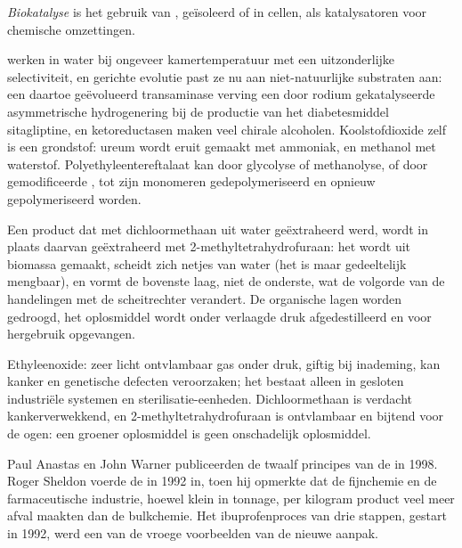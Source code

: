 \begin{definition}[Biokatalyse]\label{def:b3:green-industrial:biocatalysis}
\emph{Biokatalyse} is het gebruik van ,
geïsoleerd of in cellen, als katalysatoren voor chemische omzettingen.
\end{definition}

 werken in water bij ongeveer kamertemperatuur met een
uitzonderlijke selectiviteit, en gerichte evolutie past ze nu aan
niet-natuurlijke substraten aan: een daartoe geëvolueerd transaminase
verving een door rodium gekatalyseerde asymmetrische hydrogenering bij de
productie van het diabetesmiddel sitagliptine, en ketoreductasen maken
veel chirale alcoholen. Koolstofdioxide zelf is een grondstof: ureum
wordt eruit gemaakt met ammoniak, en methanol met waterstof.
Polyethyleentereftalaat kan door glycolyse of methanolyse, of door
gemodificeerde , tot zijn monomeren gedepolymeriseerd en opnieuw
gepolymeriseerd worden.

\begin{inthelab}
Een product dat met dichloormethaan uit water geëxtraheerd werd, wordt in
plaats daarvan geëxtraheerd met 2-methyltetrahydrofuraan: het wordt uit
biomassa gemaakt, scheidt zich netjes van water (het is maar gedeeltelijk
mengbaar), en vormt de bovenste laag, niet de onderste, wat de volgorde
van de handelingen met de scheitrechter verandert. De organische lagen
worden gedroogd, het oplosmiddel wordt onder verlaagde druk afgedestilleerd
en voor hergebruik opgevangen.
\end{inthelab}

\begin{safety}{}
Ethyleenoxide: zeer licht ontvlambaar gas onder druk, giftig bij
inademing, kan kanker en genetische defecten veroorzaken; het bestaat
alleen in gesloten industriële systemen en sterilisatie-eenheden.
Dichloormethaan is verdacht kankerverwekkend, en 2-methyltetrahydrofuraan
is ontvlambaar en bijtend voor de ogen: een groener oplosmiddel is geen
onschadelijk oplosmiddel.
\end{safety}

\begin{history}
Paul Anastas en John Warner publiceerden de twaalf principes van de
 in 1998. Roger Sheldon voerde de  in 1992 in, toen
hij opmerkte dat de fijnchemie en de farmaceutische industrie, hoewel
klein in tonnage, per kilogram product veel meer afval maakten dan de
bulkchemie. Het ibuprofenproces van drie stappen, gestart in 1992, werd
een van de vroege voorbeelden van de nieuwe aanpak.
\end{history}


